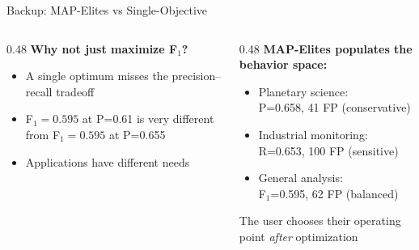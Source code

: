 \documentclass[aspectratio=169,12pt]{beamer}
\begin{document}
\begin{frame}{Backup: MAP-Elites vs Single-Objective}
  \begin{columns}[T]
    \begin{column}{0.48\textwidth}
      \textbf{Why not just maximize F$_1$?}
      \begin{itemize}
        \item A single optimum misses the precision--recall tradeoff
        \item F$_1 = 0.595$ at P=0.61 is very different from F$_1 = 0.595$ at P=0.655
        \item Applications have different needs
      \end{itemize}
    \end{column}
    \begin{column}{0.48\textwidth}
      \textbf{MAP-Elites populates the behavior space:}
      \begin{itemize}
        \item \textcolor{cbGreen}{Planetary science:}\\
              P=0.658, 41 FP (conservative)
        \item \textcolor{cbBlue}{Industrial monitoring:}\\
              R=0.653, 100 FP (sensitive)
        \item \textcolor{cbOrange}{General analysis:}\\
              F$_1$=0.595, 62 FP (balanced)
      \end{itemize}

      \vspace{0.3em}
      The user chooses their operating point \emph{after} optimization
    \end{column}
  \end{columns}
\end{frame}
\end{document}
